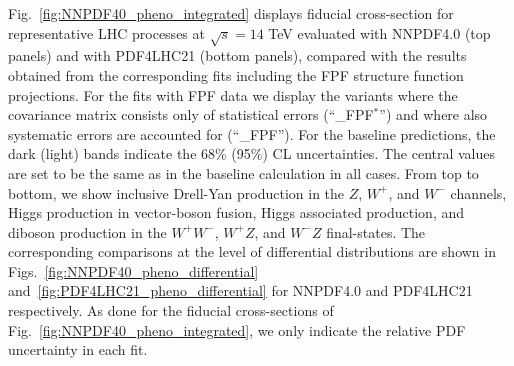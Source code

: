 Fig.~\ref{fig:NNPDF40_pheno_integrated} displays
fiducial cross-section for representative LHC processes at $\sqrt{s}=14$ TeV
evaluated with NNPDF4.0 (top panels)
and with PDF4LHC21 (bottom panels),
compared with the results obtained from
the corresponding fits including the FPF structure function projections.
%
For the fits with FPF data we display the variants where the covariance matrix
consists only of statistical errors (``\_FPF$^*$'') and where also
systematic errors are accounted for (``\_FPF'').
%
For the baseline
predictions, the dark (light) bands indicate the 68\% (95\%) CL uncertainties.
%
The central values are set to be the same as in the baseline calculation in all cases.
%
From top to bottom, we show inclusive Drell-Yan production in the $Z$, $W^+$, and $W^-$
channels, Higgs production
in vector-boson fusion, Higgs associated
production, and diboson production in the $W^+W^-$, $W^+Z$, and $W^-Z$ final-states.
%
The corresponding comparisons at the level of differential distributions
are shown in Figs.~\ref{fig:NNPDF40_pheno_differential} and~\ref{fig:PDF4LHC21_pheno_differential}
for NNPDF4.0 and PDF4LHC21 respectively.
%
As done for the fiducial cross-sections of Fig.~\ref{fig:NNPDF40_pheno_integrated},
we only indicate the relative PDF uncertainty in each fit.

